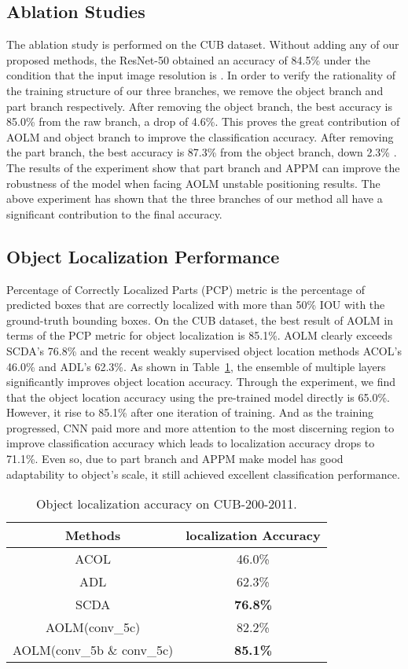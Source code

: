 \documentclass[runningheads]{llncs}
\begin{document}
\subsection{Ablation Studies}
The ablation study is performed on the CUB dataset. Without adding any of our proposed methods, the ResNet-50 \cite{he2016deep} obtained an accuracy of 84.5\% under the condition that the input image resolution is .  In order to verify the rationality of the training structure of our three branches, we remove the object branch and part branch respectively. After removing the object branch, the best accuracy is 85.0\% from the raw branch, a drop of 4.6\%. This proves the great contribution of AOLM and object branch to improve the classification accuracy. After removing the part branch, the best accuracy is 87.3\% from the object branch, down 2.3\% . The results of the experiment show that part branch and APPM can improve the robustness of the model when facing AOLM unstable positioning results. The above experiment has shown that the three branches of our method all have a significant contribution to the final accuracy. 
\subsection{Object Localization Performance}
Percentage of Correctly Localized Parts (PCP) metric is the percentage of predicted boxes that are correctly localized with more than 50\% IOU with the ground-truth bounding boxes. On the CUB dataset, the best result of AOLM in terms of the PCP metric for object localization is 85.1\%. AOLM clearly exceeds SCDA's \cite{wei2017selective} 76.8\% and the recent weakly supervised object location methods ACOL’s \cite{zhang2018adversarial} 46.0\% and  ADL’s \cite{choe2019attention} 62.3\%. As shown in Table~\ref {tb3}, the ensemble of multiple layers significantly improves object location accuracy. Through the experiment, we find that the object location accuracy using the pre-trained model directly is 65.0\%. However, it rise to 85.1\% after one iteration of training. And as the training progressed, CNN paid more and more attention to the most discerning region to improve classification accuracy which leads to localization accuracy drops to 71.1\%. Even so, due to part branch and APPM make model has good adaptability to object's scale, it still achieved excellent classification performance.
\begin{table}
\centering
\caption{Object localization accuracy on CUB-200-2011.}\label{tb3}
\begin{tabular}{|c|c|}
	\hline
	Methods & localization Accuracy \\ 
	\hline
	ACOL \cite{zhang2018adversarial} & 46.0\% \\ 
	ADL \cite{choe2019attention} & 62.3\% \\ 
	SCDA \cite{wei2017selective} &  \textbf{76.8\%} \\ 
	\hline
	AOLM(conv\_5c) & 82.2\% \\ 
	AOLM(conv\_5b \& conv\_5c) & \textbf{85.1\%} \\
	\hline
\end{tabular}
\end{table}
\end{document}
